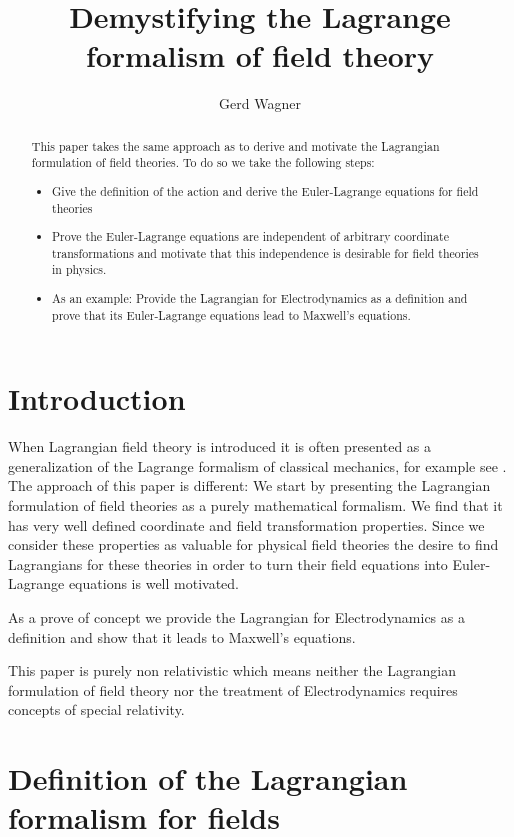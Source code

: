 \documentclass{article}
\begin{document}
\title{Demystifying the Lagrange formalism of field theory}
\author{Gerd Wagner}

\maketitle

\begin{abstract} This paper takes the same approach as \cite{WagnerGuthrie} to derive and motivate the Lagrangian formulation of field theories. To do so we take the following steps:
\begin{itemize}
\item Give the definition of the action and derive the Euler-Lagrange equations for field theories
\item Prove the Euler-Lagrange equations are independent of arbitrary coordinate transformations and motivate that this independence is desirable for field theories in physics.
\item As an example: Provide the Lagrangian for Electrodynamics as a definition and prove that its Euler-Lagrange equations lead to Maxwell's equations.
\end{itemize}
\end{abstract}


\section{Introduction}

When Lagrangian field theory is introduced it is often presented as a generalization of the Lagrange formalism of classical mechanics, for example see \cite{Goldstein}. The approach of this paper is different: We start by presenting the Lagrangian formulation of field theories as a purely mathematical formalism. We find that it has very well defined coordinate and field transformation properties. Since we consider these properties as valuable for physical field theories the desire to find Lagrangians for these theories in order to turn their field equations into Euler-Lagrange equations is well motivated. 

As a prove of concept we provide the Lagrangian for Electrodynamics as a definition and show that it leads to Maxwell's equations.

This paper is purely non relativistic which means neither the Lagrangian formulation of field theory nor the treatment of Electrodynamics requires concepts of special relativity.

\section{Definition of the Lagrangian formalism for fields}\label{definition}
\end{document}
